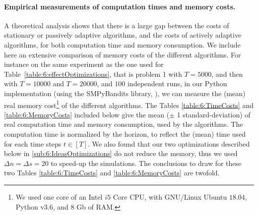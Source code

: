 

\paragraph{Empirical measurements of computation times and memory costs.}
%
A theoretical analysis shows that there is a large gap between the costs of stationary or passively adaptive algorithms,
and the costs of actively adaptive algorithms, for both computation time and memory consumption.
%
We include here an extensive comparison of memory costs of the different algorithms.
%
For instance on the same experiment as the one used for Table~\ref{table:6:effectOptimizations}, that is problem 1 with $T=5000$, and then with $T=10000$ and $T=20000$, and $100$ independent runs,
in our Python implementation (using the SMPyBandits library, \cite{SMPyBandits}), we can measure the (mean) real memory cost\footnote{We used one core of an Intel $i5$ Core CPU, with GNU/Linux Ubuntu $18.04$, Python v$3.6$, and $8$ Gb of RAM.} of the different algorithms.
The Tables \ref{table:6:TimeCosts} and \ref{table:6:MemoryCosts} included below give the mean ($\pm$ 1 standard-deviation) of real computation time and memory consumption, used by the algorithms.
The computation time is normalized by the horizon, to reflect the (mean) time used for each time steps $t\in[T]$.
%
We also found that our two optimizations described below in \ref{sub:6:IdeasOptimizations} do not reduce the memory, thus we used $\Delta n = \Delta s = 20$ to speed-up the simulations.
%
The conclusions to draw for these two Tables \ref{table:6:TimeCosts} and \ref{table:6:MemoryCosts} are twofold.


